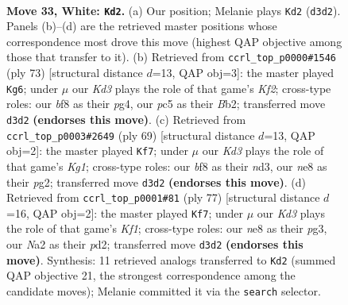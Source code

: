 \documentclass[11pt]{article}
\begin{document}
\clearpage

\begin{figure}[p]\centering
\begin{subfigure}{0.46\textwidth}\centering
\resizebox{\linewidth}{!}{%
\newchessgame
\chessboard[
  setfen={3knb2/8/4P3/2pP2p1/8/1P1K4/N7/8 w - - 1 33},
  showmover=false,
  pgfstyle=straightmove, color=movearrow, markmove={d3-d2}
]}
\caption{}
\end{subfigure}\hfill
\begin{subfigure}{0.46\textwidth}\centering
\resizebox{\linewidth}{!}{%
\newchessgame
\chessboard[
  setfen={8/5k2/7p/6p1/6P1/3P4/1b3P1K/6N1 b - - 1 37},
  showmover=false,
  pgfstyle=straightmove, color=movearrow, markmove={f7-g6}
]}
\caption{}
\end{subfigure}
\\[4pt]
\begin{subfigure}{0.46\textwidth}\centering
\resizebox{\linewidth}{!}{%
\newchessgame
\chessboard[
  setfen={6k1/8/4pp2/6p1/4P3/1n1N3P/6P1/6K1 b - - 0 35},
  showmover=false,
  pgfstyle=straightmove, color=movearrow, markmove={g8-f7}
]}
\caption{}
\end{subfigure}\hfill
\begin{subfigure}{0.46\textwidth}\centering
\resizebox{\linewidth}{!}{%
\newchessgame
\chessboard[
  setfen={5k2/7p/7P/4p3/6p1/6P1/3P1K2/8 b - - 1 39},
  showmover=false,
  pgfstyle=straightmove, color=movearrow, markmove={f8-f7}
]}
\caption{}
\end{subfigure}
\caption{\textbf{Move 33, White: \texttt{Kd2}.} (a) Our position; Melanie plays \texttt{Kd2} (\texttt{d3d2}). Panels (b)--(d) are the retrieved master positions whose correspondence most drove this move (highest QAP objective among those that transfer to it). (b) Retrieved from \texttt{ccrl\_top\_p0000\#1546} (ply 73) [structural distance $d$=13, QAP obj=3]: the master played \texttt{Kg6}; under $\mu$ our \emph{Kd3} plays the role of that game's \emph{Kf2}; cross-type roles: our \emph{b}f8 as their \emph{p}g4, our \emph{p}c5 as their \emph{B}b2; transferred move \texttt{d3d2} \textbf{(endorses this move)}. (c) Retrieved from \texttt{ccrl\_top\_p0003\#2649} (ply 69) [structural distance $d$=13, QAP obj=2]: the master played \texttt{Kf7}; under $\mu$ our \emph{Kd3} plays the role of that game's \emph{Kg1}; cross-type roles: our \emph{b}f8 as their \emph{n}d3, our \emph{n}e8 as their \emph{p}g2; transferred move \texttt{d3d2} \textbf{(endorses this move)}. (d) Retrieved from \texttt{ccrl\_top\_p0001\#81} (ply 77) [structural distance $d$=16, QAP obj=2]: the master played \texttt{Kf7}; under $\mu$ our \emph{Kd3} plays the role of that game's \emph{Kf1}; cross-type roles: our \emph{n}e8 as their \emph{p}g3, our \emph{N}a2 as their \emph{p}d2; transferred move \texttt{d3d2} \textbf{(endorses this move)}. Synthesis: 11 retrieved analogs transferred to \texttt{Kd2} (summed QAP objective 21, the strongest correspondence among the candidate moves); Melanie committed it via the \texttt{search} selector.}
\label{fig:thought-m64}
\end{figure}
\end{document}
